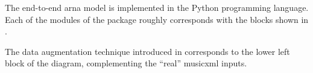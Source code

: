
The end-to-end \gls{arna} model is implemented in the Python
programming language. Each of the modules of the package
roughly corresponds with the blocks shown in
.


The data augmentation technique introduced in
 corresponds to the
lower left block of the diagram, complementing the ``real''
\gls{musicxml} inputs.
